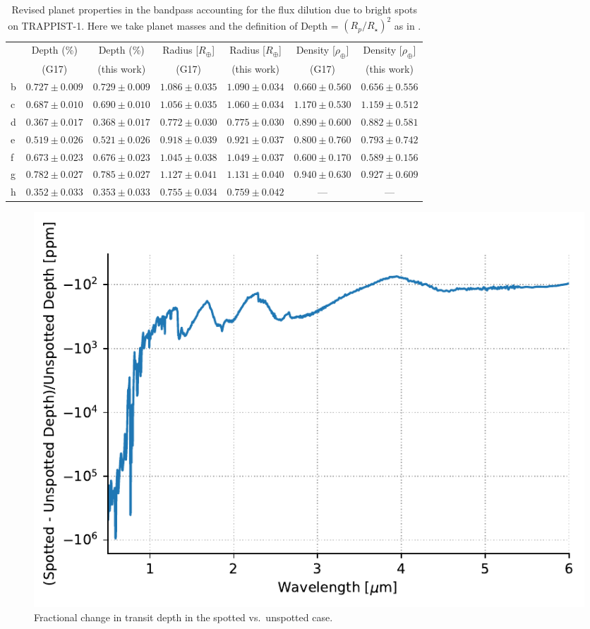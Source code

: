\begin{subappendices}
\begin{table}
\small
\centering
\begin{tabular}{l|cccccc}
 & Depth (\%) & Depth (\%) & Radius [$R_\oplus$] & Radius [$R_\oplus$] & Density [$\rho_\oplus$]& Density [$\rho_\oplus$] \\
& (G17) & (this work) & (G17) & (this work)  & (G17) & (this work) \\ \hline
b & $0.727 \pm 0.009$ & $0.729 \pm 0.009$ & $1.086 \pm 0.035$ & $1.090 \pm 0.034$ & $0.660 \pm 0.560$ & $0.656 \pm 0.556$ \\
c & $0.687 \pm 0.010$ & $0.690 \pm 0.010$ & $1.056 \pm 0.035$ & $1.060 \pm 0.034$ & $1.170 \pm 0.530$ & $1.159 \pm 0.512$ \\
d & $0.367 \pm 0.017$ & $0.368 \pm 0.017$ & $0.772 \pm 0.030$ & $0.775 \pm 0.030$ & $0.890 \pm 0.600$ & $0.882 \pm 0.581$ \\
e & $0.519 \pm 0.026$ & $0.521 \pm 0.026$ & $0.918 \pm 0.039$ & $0.921 \pm 0.037$ & $0.800 \pm 0.760$ & $0.793 \pm 0.742$ \\
f & $0.673 \pm 0.023$ & $0.676 \pm 0.023$ & $1.045 \pm 0.038$ & $1.049 \pm 0.037$ & $0.600 \pm 0.170$ & $0.589 \pm 0.156$ \\
g & $0.782 \pm 0.027$ & $0.785 \pm 0.027$ & $1.127 \pm 0.041$ & $1.131 \pm 0.040$ & $0.940 \pm 0.630$ & $0.927 \pm 0.609$ \\
h & $0.352 \pm 0.033$ & $0.353 \pm 0.033$ & $0.755 \pm 0.034$ & $0.759 \pm 0.042$ & --- & --- \\
\end{tabular}
\caption{Revised planet properties in the \kepler bandpass accounting for the flux dilution due to bright spots on TRAPPIST-1. Here we take planet masses and the definition of Depth = $(R_p/R_\star)^2$ as in \citet{Gillon2017}. \label{tab:planets}}
\end{table}

\begin{figure}
\begin{center}
\includegraphics[scale=1]{trappist1_bright/transmission_spectrum.pdf}
\end{center}
\caption{Fractional change in transit depth in the spotted vs.\ unspotted case.  \label{fig:transmission}}
\end{figure}



\end{subappendices}
